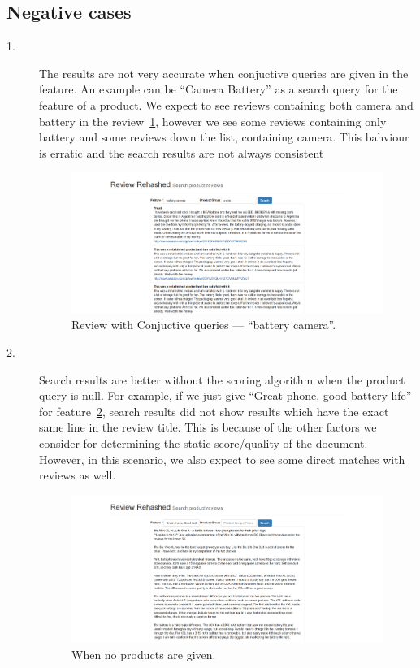 \documentclass{article}
\begin{document}
\subsection{Negative cases}
			\begin{description}
        \item[1.] The results are not very accurate when conjuctive queries are given in the feature. An example can be ``Camera Battery'' as a search query for the feature of a product. We expect to see reviews containing both camera and battery in the review~\ref{fig:battery_camera}, however we see some reviews containing only battery and some reviews down the list, containing camera. This bahviour is erratic and the search results are not always consistent
					\begin{figure}[ht!]
					  \centering
					  \includegraphics[width=1\textwidth]{battery_camera}
					  \caption{Review with Conjuctive queries --- ``battery camera''.~\label{fig:battery_camera}}
					\end{figure}
        \item[2.] Search results are better without the scoring algorithm when the product query is null. For example, if we just give ``Great phone, good battery life'' for feature~\ref{fig:no_product}, search results did not show results which have the exact same line in the review title. This is because of the other factors we consider for determining the static score/quality of the document. However, in this scenario, we also expect to see some direct matches with reviews as well. 
					\begin{figure}[ht!]
					  \centering
					  \includegraphics[width=1\textwidth]{no_product}
					  \caption{When no products are given.~\label{fig:no_product}}
					\end{figure}
			\end{description}
\end{document}
